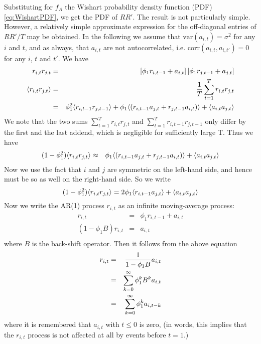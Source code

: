 \documentclass{book}
\begin{document}
Substituting for $f_A$ the Wishart probability density function (PDF)
\ref{eq:WishartPDF}, we get the PDF of $RR'$. The result is not
particularly simple. However, a relatively simple approximate
expression for the off-diagonal entries of $RR'/T$ may be
obtained. In the following we assume that $\text{var}(a_{i,t}) =
\sigma^2$ for any $i$ and $t$, and as always, that $a_{i,t}$ are not
autocorrelated, i.e. $\text{corr}(a_{i,t}, a_{i, t'}) = 0$ for any
$i$, $t$ and $t'$. We have
\begin{eqnarray*}
  r_{i,t} r_{j, t} &=& \left[
    \phi_1 r_{i, t-1} + a_{i, t}
  \right] \left[
    \phi_1 r_{j, t-1} + a_{j, t}
  \right] \\
  \langle r_{i,t} r_{j, t}\rangle &=& {1 \over T}\sum_{t=1}^T r_{i,t} r_{j, t} \\
  &=& \phi_1^2 \langle r_{i,t-1} r_{j, t-1}\rangle + \phi_1\langle\left(
    r_{i, t-1} a_{j, t} + r_{j, t-1} a_{i, t}
  \right)\rangle + \langle a_{i,t} a_{j,t}\rangle
\end{eqnarray*}
We note that the two sums $\sum_{t=1}^T r_{i,t} r_{j, t}$ and
$\sum_{t=1}^T r_{i,t-1} r_{j, t-1}$ only differ by the first and the
last addend, which is negligible for sufficiently large T. Thus we
have
\begin{eqnarray*}
  (1 - \phi_1^2)\langle r_{i,t} r_{j, t}\rangle &\approx& \phi_1\langle\left(
    r_{i, t-1} a_{j, t} + r_{j, t-1} a_{i, t}
  \right)\rangle + \langle a_{i,t} a_{j,t}\rangle
\end{eqnarray*}
Now we use the fact that $i$ and $j$ are symmetric on the left-hand
side, and hence must be so as well on the right-hand side. So we write
\begin{equation}\label{eq:Offdiag1}
  (1 - \phi_1^2)\langle r_{i,t} r_{j, t}\rangle = 2\phi_1\langle r_{i, t-1}
    a_{j, t}\rangle + \langle a_{i,t} a_{j,t}\rangle
\end{equation}
Now we write the AR(1) process $r_{i,t}$ as an infinite moving-average
process:
\begin{eqnarray*}
  r_{i, t} &=& \phi_1 r_{i, t-1} + a_{i,t} \\
  (1 - \phi_1 B) r_{i, t} &=& a_{i,t} \\
\end{eqnarray*}
where $B$ is the back-shift operator. Then it follows from the above
equation
\begin{eqnarray*}
  r_{i,t} &=& {1 \over 1 - \phi_1 B} a_{i,t} \\
  &=& \sum_{k=0}^\infty \phi_1^k B^k a_{i,t} \\
  &=& \sum_{k=0}^\infty \phi_1^k a_{i,t-k} \\
\end{eqnarray*}
where it is remembered that $a_{i, t}$ with $t \leq 0$ is zero, (in
words, this implies that the $r_{i,t}$ process is not affected at all
by events before $t = 1$.)
\end{document}
